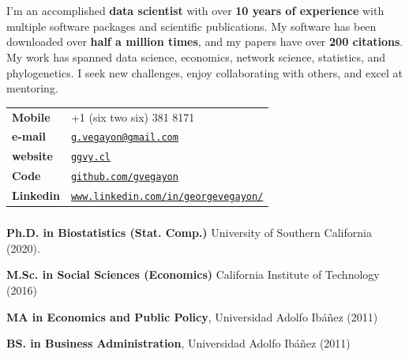 \documentclass[letterpaper, 9pt]{article}
\newcommand{\myorange}{myteal!70!black}
\newcommand{\darkorange}{\myorange !50!black}
\renewcommand{\bf}{\bfseries\color{\myorange}}
\renewcommand{\textbf}[1]{{\bfseries\color{\myorange}#1}}
\def\name{George G. Vega Yon, Ph.D.}
\renewenvironment{itemize}{
  \begin{list}{}{
    \setlength{\leftmargin}{0.3cm}
  }
}{
  \end{list}
}
\begin{document}
	\part*{\color{darkgray}{\name}} 
	
	\vspace{-.25cm}
	\bigskip


	\begin{minipage}{.9\linewidth}
	\raggedright
	I'm an accomplished \textbf{data scientist} with over \textbf{10 years of experience} with multiple software packages and scientific publications. My software has been downloaded over \textbf{half a million times}, and my papers have over \textbf{200 citations}. My work has spanned data science, economics, network science, statistics, and phylogenetics. I seek new challenges, enjoy collaborating with others, and excel at mentoring.
	\end{minipage}

	\bigskip



\begin{minipage}{0.50\linewidth}
  \begin{tabular}{>{\bfseries}p{.2\linewidth}p{.79\linewidth}}
    Mobile & +1 (six two six) 381 8171 \\
    e-mail & \href{mailto:g.vegayon@gmail.com}{\tt g.vegayon@gmail.com} \\
    website & \href{https://ggvy.cl}{\tt ggvy.cl} \\
    Code & \href{https://github.com/gvegayon}{\tt github.com/gvegayon}\\
    Linkedin & \href{https://www.linkedin.com/in/georgevegayon/}{\tt www.linkedin.com/in/georgevegayon/} %
  \end{tabular}
\end{minipage}


\section*{\color{\darkorange}{Education}}
\vspace{-.25cm}

\begin{itemize}
\item 
{\bf Ph.D. in Biostatistics (Stat. Comp.)} University of Southern California (2020).

{\bf M.Sc. in Social Sciences (Economics)} California Institute of Technology (2016)

{\bf MA in Economics and Public Policy}, Universidad Adolfo Ib\'a\~nez (2011)

{\bf BS. in Business Administration}, Universidad Adolfo Ib\'a\~nez (2011)
\end{itemize}
\end{document}
